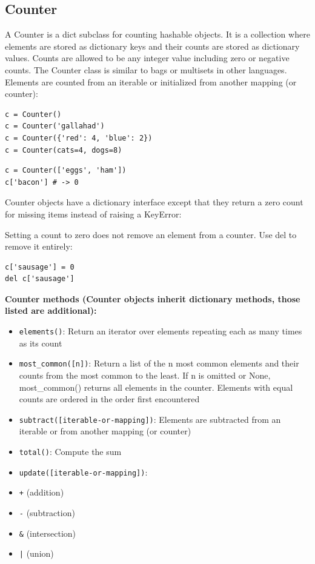 \documentclass{report}
\begin{document}
    \subsection{Counter} 
    \bigbreak \noindent
    A Counter is a dict subclass for counting hashable objects. It is a collection where elements are stored as dictionary keys and their counts are stored as dictionary values. Counts are allowed to be any integer value including zero or negative counts. The Counter class is similar to bags or multisets in other languages.
    \bigbreak \noindent 
    Elements are counted from an iterable or initialized from another mapping (or counter):
    \bigbreak \noindent 
    \begin{minipage}{0.47\textwidth}
    \begin{verbatim}
c = Counter()                 
c = Counter('gallahad')     
c = Counter({'red': 4, 'blue': 2})
c = Counter(cats=4, dogs=8)
    \end{verbatim}
    \end{minipage}
    \hfill
    \begin{minipage}{0.47\textwidth}
        \vspace{0.2in} 
        \begin{verbatim}
c = Counter(['eggs', 'ham'])
c['bacon'] # -> 0
    \end{verbatim}
    Counter objects have a dictionary interface except that they return a zero count for missing items instead of raising a KeyError:
    \end{minipage}
    \bigbreak \noindent 
    Setting a count to zero does not remove an element from a counter. Use del to remove it entirely:
    \begin{verbatim}
c['sausage'] = 0
del c['sausage']
    \end{verbatim}
    \bigbreak \noindent 
    \textbf{Counter methods (Counter objects inherit dictionary methods, those listed are additional):}
    \begin{itemize}[noitemsep]
      \item \texttt{elements()}: Return an iterator over elements repeating each as many times as its count
      \item \texttt{most\_common([n])}: Return a list of the n most common elements and their counts from the most common to the least. If n is omitted or None, most\_common() returns all elements in the counter. Elements with equal counts are ordered in the order first encountered
      \item \texttt{subtract([iterable-or-mapping])}: Elements are subtracted from an iterable or from another mapping (or counter)
        \item \texttt{total()}: Compute the sum
      \item \texttt{update([iterable-or-mapping])}:
      \item \texttt{+} (addition)
      \item \texttt{-} (subtraction)
      \item \texttt{\&} (intersection)
      \item \texttt{|} (union)
    \end{itemize}
\end{document}
